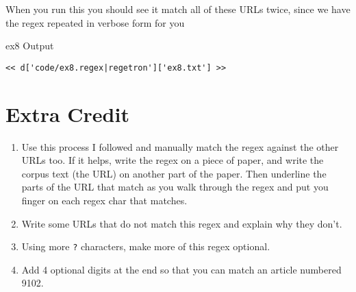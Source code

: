When you run this you should see it match all of these URLs twice, since
we have the regex repeated in verbose form for you

\begin{code}{ex8 Output}
\begin{Verbatim}
<< d['code/ex8.regex|regetron']['ex8.txt'] >>
\end{Verbatim}
\end{code}


\section{Extra Credit}

\begin{enumerate}
\item Use this process I followed and manually match the regex against the 
    other URLs too.  If it helps, write the regex on a piece of paper, and 
    write the corpus text (the URL) on another part of the paper.  Then underline
    the parts of the URL that match as you walk through the regex and put
    you finger on each regex char that matches.
\item Write some URLs that do not match this regex and explain why they don't.
\item Using more \verb|?| characters, make more of this regex optional.
\item Add 4 optional digits at the end so that you can match an article numbered
    9102.
\end{enumerate}


